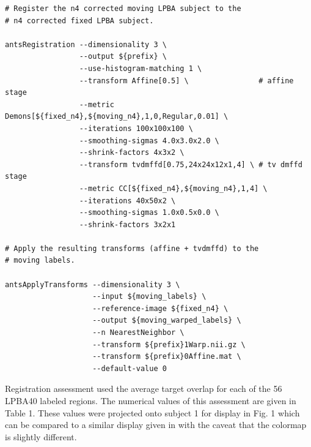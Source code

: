 \documentclass{llncs}
\begin{document}
\vspace{2mm}
\begin{lstlisting}
# Register the n4 corrected moving LPBA subject to the 
# n4 corrected fixed LPBA subject.

antsRegistration --dimensionality 3 \
                 --output ${prefix} \
                 --use-histogram-matching 1 \
                 --transform Affine[0.5] \                # affine stage
                 --metric Demons[${fixed_n4},${moving_n4},1,0,Regular,0.01] \ 
                 --iterations 100x100x100 \
                 --smoothing-sigmas 4.0x3.0x2.0 \
                 --shrink-factors 4x3x2 \
                 --transform tvdmffd[0.75,24x24x12x1,4] \ # tv dmffd stage
                 --metric CC[${fixed_n4},${moving_n4},1,4] \ 
                 --iterations 40x50x2 \
                 --smoothing-sigmas 1.0x0.5x0.0 \
                 --shrink-factors 3x2x1

# Apply the resulting transforms (affine + tvdmffd) to the 
# moving labels.
                   
antsApplyTransforms --dimensionality 3 \
                    --input ${moving_labels} \
                    --reference-image ${fixed_n4} \
                    --output ${moving_warped_labels} \
                    --n NearestNeighbor \
                    --transform ${prefix}1Warp.nii.gz \
                    --transform ${prefix}0Affine.mat \
                    --default-value 0
\end{lstlisting}

Registration assessment used the average target overlap 
\cite{tustison2009a} for each of the 56 LPBA40 labeled regions.
The numerical values of this assessment are given in Table 1.
These values were projected onto subject 1 for display in Fig. 1
which can be compared to a similar display given in \cite{Klein2009}
with the caveat that the colormap is slightly different. 
\end{document}
